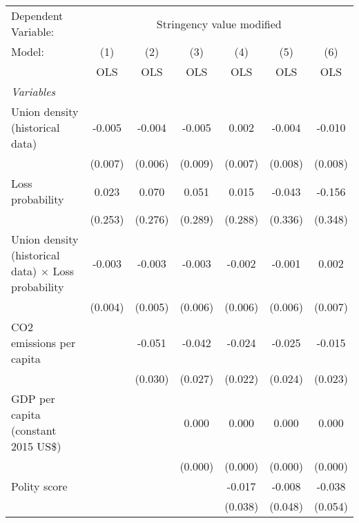 
\begingroup
\centering
\begin{tabular}{lcccccc}
   \toprule
   Dependent Variable: & \multicolumn{6}{c}{Stringency value modified}\\
   Model:                                                     & (1)     & (2)     & (3)     & (4)     & (5)     & (6)\\  
                                                              &  OLS    & OLS     & OLS     & OLS     & OLS     & OLS\\  
   \midrule
   \emph{Variables}\\
   Union density (historical data)                            & -0.005  & -0.004  & -0.005  & 0.002   & -0.004  & -0.010\\   
                                                              & (0.007) & (0.006) & (0.009) & (0.007) & (0.008) & (0.008)\\   
   Loss probability                                           & 0.023   & 0.070   & 0.051   & 0.015   & -0.043  & -0.156\\   
                                                              & (0.253) & (0.276) & (0.289) & (0.288) & (0.336) & (0.348)\\   
   Union density (historical data) $\times$ Loss probability  & -0.003  & -0.003  & -0.003  & -0.002  & -0.001  & 0.002\\   
                                                              & (0.004) & (0.005) & (0.006) & (0.006) & (0.006) & (0.007)\\   
   CO2 emissions per capita                                   &         & -0.051  & -0.042  & -0.024  & -0.025  & -0.015\\   
                                                              &         & (0.030) & (0.027) & (0.022) & (0.024) & (0.023)\\   
   GDP per capita (constant 2015 US\$)                        &         &         & 0.000   & 0.000   & 0.000   & 0.000\\   
                                                              &         &         & (0.000) & (0.000) & (0.000) & (0.000)\\   
   Polity score                                               &         &         &         & -0.017  & -0.008  & -0.038\\   
                                                              &         &         &         & (0.038) & (0.048) & (0.054)\\   

\end{tabular}
